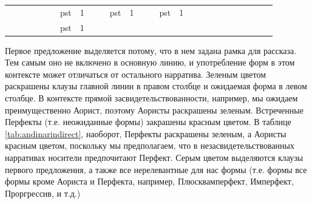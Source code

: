 \begin{table}[H]
\begin{center}
\begin{tabular}{llllllllllllllllllllllllll}
                          &   &                             &                           &                             &                           & \cellcolor[HTML]{9AFF99}pst & \cellcolor[HTML]{9AFF99}1 &                             &                           & \cellcolor[HTML]{9AFF99}pst & \cellcolor[HTML]{9AFF99}1 &                             &                           & \cellcolor[HTML]{9AFF99}pst & \cellcolor[HTML]{9AFF99}1 &            &          &             &           &              &           &             &           &                             &                           \\
                          &   &                             &                           &                             &                           & \cellcolor[HTML]{9AFF99}pst & \cellcolor[HTML]{9AFF99}1 &                             &                           &                             &                           &                             &                           &                             &                           &            &          &             &           &              &           &             &           &                             &                          
\end{tabular}
\end{center}
\end{table}

Первое предложение выделяется потому, что в нем задана рамка для рассказа. Тем самым оно не включено в основную линию, и употребление форм в этом контексте может отличаться от остального нарратива. Зеленым цветом раскрашены клаузы главной линии в правом столбце и ожидаемая форма в левом столбце. В контексте прямой засвидетельствованности, например, мы ожидаем преимущественно Аорист, поэтому Аористы раскрашены зеленым. Встреченные Перфекты (т.е. неожиданные формы) закрашены красным цветом. В таблице \ref{tab:andinarindirect}, наоборот, Перфекты раскрашены зеленым, а Аористы красным цветом, поскольку мы предполагаем, что в незасвидетельствованных нарративах носители предпочитают Перфект. Серым цветом выделяются клаузы первого предложения, а также все нерелевантные для нас формы (т.е. формы все формы кроме Аориста и Перфекта, например, Плюсквамперфект, Имперфект, Проргрессив, и т.д.)

